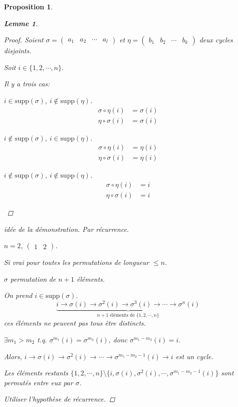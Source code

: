\documentclass{report}
\newcommand*{\lte}{\leqslant}
\newtheorem*{lem}{Lemme}
\newtheorem*{prop}{Proposition}
\theoremstyle{definition}
\theoremstyle{remark}
\begin{document}
\begin{prop}
\begin{lem}
\begin{proof}
				Soient $\sigma=\begin{pmatrix}
					a_1&a_2&\dotsb&a_l
				\end{pmatrix}$ et $\eta=\begin{pmatrix}
				b_1&b_2&\dotsb&b_k
				\end{pmatrix}$ deux cycles disjoints.

				Soit $i \in \{1,2,\dotsb,n\}$.

				Il y a trois cas:
				\begin{nlist}
					\item $i \in \mathrm{supp}(\sigma)$, $i \notin \mathrm{supp}(\eta)$.
					\begin{align*}
						\sigma \circ \eta(i)&= \sigma(i)\\
						\eta \circ \sigma(i)&= \sigma(i)
					\end{align*}
					\item $i \notin \mathrm{supp}(\sigma)$, $i \in \mathrm{supp}(\eta)$.
					\begin{align*}
						\sigma \circ \eta(i)&= \eta(i)\\
						\eta \circ \sigma(i)&= \eta(i)
					\end{align*}
					\item $i \notin \mathrm{supp}(\sigma)$, $i \notin \mathrm{supp}(\eta)$.
					\begin{align*}
						\sigma \circ \eta(i)&= i\\
						\eta \circ \sigma(i)&=i
					\end{align*}
				\end{nlist}
			\end{proof}
		\end{lem}
		\begin{proof}[id\'ee de la d\'emonstration]
			Par r\'ecurrence.

			$n=2$, $\begin{pmatrix}
				1&2
			\end{pmatrix}$.

			Si vrai pour toutes les permutations de longueur $\lte n$.

			$\sigma$ permutation de $n+1$ \'el\'ements.

			On prend $i \in \mathrm{supp}(\sigma)$.
			\[
			\underbrace{i \to \sigma(i) \to \sigma^2(i) \to \sigma^3(i) \to \dotsb \to \sigma^n(i)}_{n+1\text{ \'el\'ements de }\{1,2,\dotsb,n\}}
			\]
			ces \'el\'ements ne peuvent pas tous \^etre distincts.

			$\exists m_1>m_2$ t.q. $\sigma^{m_1}(i) = \sigma^{m_2}(i)$, donc $\sigma^{m_1-m_2}(i) = i$.

			Alors, $i \to \sigma(i) \to \sigma^2(i) \to \dotsb \to \sigma^{m_1-m_2-1}(i) \to i$ est un cycle.

			Les \'el\'ements restants $\{1,2,\dotsb,n\} \setminus \{i, \sigma(i), \sigma^2(i), \dotsb, \sigma^{m_1-m_2-1}(i)\}$ sont permut\'es entre eux par $\sigma$.

			Utiliser l'hypoth\`ese de r\'ecurrence.
			\renewcommand{\qedsymbol}{\#}
		\end{proof}
		\renewcommand{\qedsymbol}{$\square$}
	\end{prop}
\end{document}
